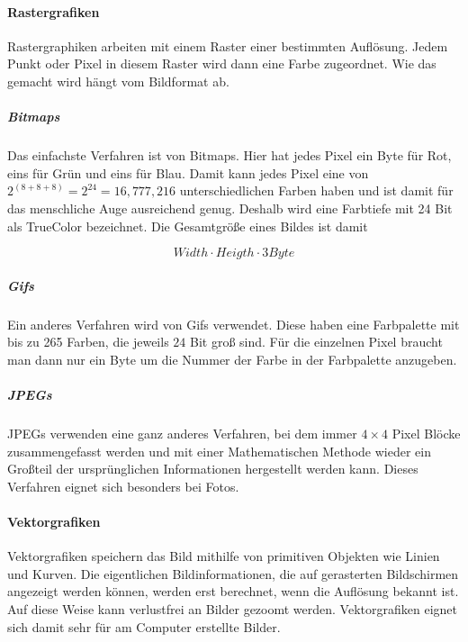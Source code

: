 \documentclass[../main.tex]{subfiles}
\begin{document}
            \paragraph{Rastergrafiken}
                Rastergraphiken arbeiten mit einem Raster einer bestimmten Auflösung. Jedem Punkt oder Pixel in diesem Raster wird dann eine Farbe zugeordnet. Wie das gemacht wird hängt vom Bildformat ab.
                
                \subparagraph{Bitmaps}
                Das einfachste Verfahren ist von Bitmaps. Hier hat jedes Pixel ein Byte für Rot, eins für Grün und eins für Blau. Damit kann jedes Pixel eine von $2^(8+8+8) = 2^24 = 16,777,216$ unterschiedlichen Farben haben und ist damit für das menschliche Auge ausreichend genug. Deshalb wird eine Farbtiefe mit 24 Bit als TrueColor bezeichnet. Die Gesamtgröße eines Bildes ist damit
                
                \begin{equation}
                    Width \cdot Heigth \cdot 3Byte
                \end{equation}
                
                \subparagraph{Gifs}
                Ein anderes Verfahren wird von Gifs verwendet. Diese haben eine Farbpalette mit bis zu 265 Farben, die jeweils $24$ Bit groß sind. Für die einzelnen Pixel braucht man dann nur ein Byte um die Nummer der Farbe in der Farbpalette anzugeben.
                
                \subparagraph{JPEGs}
                JPEGs verwenden eine ganz anderes Verfahren, bei dem immer $4 \times 4$ Pixel Blöcke zusammengefasst werden und mit einer Mathematischen Methode wieder ein Großteil der ursprünglichen Informationen hergestellt werden kann. Dieses Verfahren eignet sich besonders bei Fotos.
            
            \paragraph{Vektorgrafiken}
                Vektorgrafiken speichern das Bild mithilfe von primitiven Objekten wie Linien und Kurven. Die eigentlichen Bildinformationen, die auf gerasterten Bildschirmen angezeigt werden können, werden erst berechnet, wenn die Auflösung bekannt ist. Auf diese Weise kann verlustfrei an Bilder gezoomt werden. Vektorgrafiken eignet sich damit sehr für am Computer erstellte Bilder.
            
\end{document}
